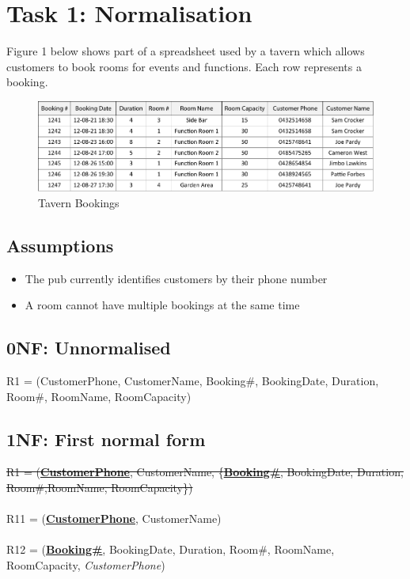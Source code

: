 \section{Task 1: Normalisation}

Figure 1 below shows part of a spreadsheet used by a tavern which allows customers to book rooms for events and functions. Each row represents a booking.

\begin{figure}[H]
\centering
\caption{Tavern Bookings}
\includegraphics[scale=1]{./img/task1.pdf}
\end{figure}

\subsection*{Assumptions}

\begin{itemize}
\item The pub currently identifies customers by their phone number
\item A room cannot have multiple bookings at the same time
\end{itemize}

\subsection{0NF: Unnormalised}

R1 = (CustomerPhone, CustomerName, {Booking\#, BookingDate, Duration, Room\#, RoomName, RoomCapacity})

\subsection{1NF: First normal form}

\sout{R1 = (\textbf{\underline{CustomerPhone}}, CustomerName, \{\textbf{\underline{Booking\#}}, BookingDate, Duration, Room\#,RoomName, RoomCapacity\})}
\\\\
R11 = (\textbf{\underline{CustomerPhone}}, CustomerName)
\\\\
R12 = (\textbf{\underline{Booking\#}}, BookingDate, Duration, Room\#, RoomName, RoomCapacity, \emph{CustomerPhone})

